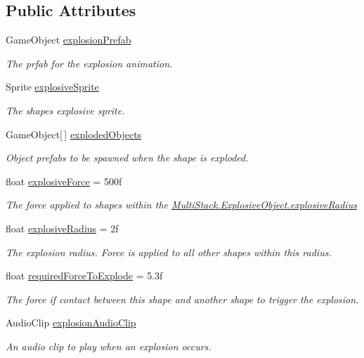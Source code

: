 \subsection*{Public Attributes}
\begin{DoxyCompactItemize}
\item 
Game\+Object \hyperlink{class_multi_stack_1_1_explosive_object_a22de7a92e4da52f57888874f2d978f56}{explosion\+Prefab}
\begin{DoxyCompactList}\small\item\em The prfab for the explosion animation. \end{DoxyCompactList}\item 
Sprite \hyperlink{class_multi_stack_1_1_explosive_object_a837c3ceaac83c66cbb0b35de25a4821e}{explosive\+Sprite}
\begin{DoxyCompactList}\small\item\em The shapes explosive sprite. \end{DoxyCompactList}\item 
Game\+Object\mbox{[}$\,$\mbox{]} \hyperlink{class_multi_stack_1_1_explosive_object_a675d3ee346269c79e0b60fb0e6eb38b9}{exploded\+Objects}
\begin{DoxyCompactList}\small\item\em Object prefabs to be spawned when the shape is exploded. \end{DoxyCompactList}\item 
float \hyperlink{class_multi_stack_1_1_explosive_object_abd25f5c7fec269baf7f18cafdb9a8f41}{explosive\+Force} = 500f
\begin{DoxyCompactList}\small\item\em The force applied to shapes within the \hyperlink{class_multi_stack_1_1_explosive_object_a409a2b47d8945963839fae41b038e1f5}{Multi\+Stack.\+Explosive\+Object.\+explosive\+Radius} \end{DoxyCompactList}\item 
float \hyperlink{class_multi_stack_1_1_explosive_object_a409a2b47d8945963839fae41b038e1f5}{explosive\+Radius} = 2f
\begin{DoxyCompactList}\small\item\em The explosion radius. Force is applied to all other shapes within this radius. \end{DoxyCompactList}\item 
float \hyperlink{class_multi_stack_1_1_explosive_object_aa56e67200c145c64a54a898e5b060456}{required\+Force\+To\+Explode} = 5.\+3f
\begin{DoxyCompactList}\small\item\em The force if contact between this shape and another shape to trigger the explosion. \end{DoxyCompactList}\item 
Audio\+Clip \hyperlink{class_multi_stack_1_1_explosive_object_ad7c26f2f4ee443b5f18b935a501bc01d}{explosion\+Audio\+Clip}
\begin{DoxyCompactList}\small\item\em An audio clip to play when an explosion occurs. \end{DoxyCompactList}\end{DoxyCompactItemize}
